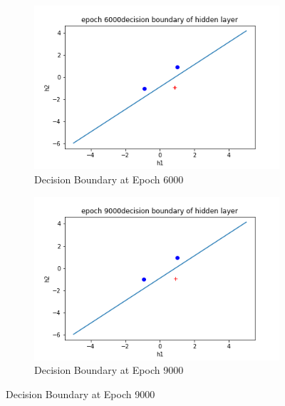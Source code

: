 \documentclass{article}
\begin{document}
\begin{enumerate}
     	
     	\begin{figure}[H]
     	\centering
     	\begin{subfigure}[b]{0.45\textwidth}
         	\centering
         	\includegraphics[width=\textwidth]
         	{epoch 6000 decision boundary of hidden layer.png}
         	\caption{Decision Boundary at Epoch 6000}
         	\label{fig:Hyperplane Epoch 2000}
     	\end{subfigure}
     	\hfill
     	\begin{subfigure}[b]{0.45\textwidth}
         	\centering
         	\includegraphics[width=\textwidth]
         	{epoch 9000 decision boundary of hidden layer.png}
         	\caption{Decision Boundary at Epoch 9000}
         	\label{fig:Hyperplane Epoch 3000}
     	\end{subfigure}
		
		\end{figure}
		

\end{enumerate}
\end{document}
